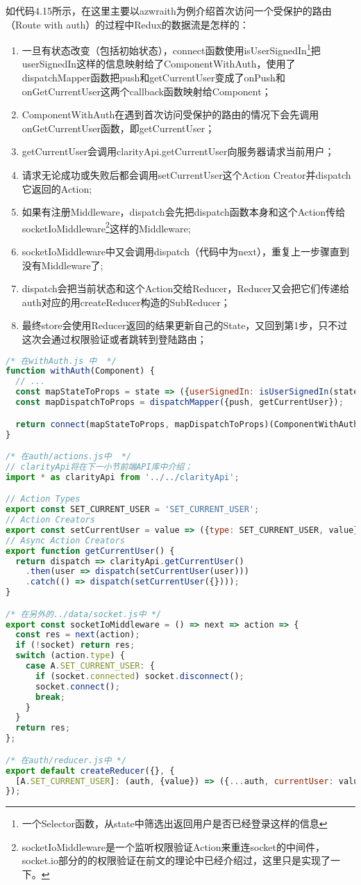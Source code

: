如代码4.15所示，在这里主要以azwraith为例介绍首次访问一个受保护的路由（Route with auth）的过程中Redux的数据流是怎样的：
\begin{enumerate}
  \item 一旦有状态改变（包括初始状态），connect函数使用isUserSignedIn\footnote{一个Selector函数，从state中筛选出返回用户是否已经登录这样的信息}把userSignedIn这样的信息映射给了ComponentWithAuth，使用了dispatchMapper函数把push和getCurrentUser变成了onPush和onGetCurrentUser这两个callback函数映射给Component；
  \item ComponentWithAuth在遇到首次访问受保护的路由的情况下会先调用onGetCurrentUser函数，即getCurrentUser；
  \item getCurrentUser会调用clarityApi.getCurrentUser向服务器请求当前用户；
  \item 请求无论成功或失败后都会调用setCurrentUser这个Action Creator并dispatch它返回的Action;
  \item 如果有注册Middleware，dispatch会先把dispatch函数本身和这个Action传给socketIoMiddleware\footnote{socketIoMiddleware是一个监听权限验证Action来重连socket的中间件，socket.io部分的的权限验证在前文的理论中已经介绍过，这里只是实现了一下。}这样的Middleware;
  \item socketIoMiddleware中又会调用dispatch（代码中为next），重复上一步骤直到没有Middleware了;
  \item dispatch会把当前状态和这个Action交给Reducer，Reducer又会把它们传递给auth对应的用createReducer构造的SubReducer；
  \item 最终store会使用Reducer返回的结果更新自己的State，又回到第1步，只不过这次会通过权限验证或者跳转到登陆路由；
\end{enumerate}
\begin{lstlisting}[language={JavaScript}, caption={Smart City模块权限校验Redux数据流相关代码}]
/* 在withAuth.js 中  */
function withAuth(Component) {
  // ...
  const mapStateToProps = state => ({userSignedIn: isUserSignedIn(state)});
  const mapDispatchToProps = dispatchMapper({push, getCurrentUser});

  return connect(mapStateToProps, mapDispatchToProps)(ComponentWithAuth);
}

/* 在auth/actions.js中  */
// clarityApi将在下一小节前端API库中介绍；
import * as clarityApi from '../../clarityApi';

// Action Types
export const SET_CURRENT_USER = 'SET_CURRENT_USER';
// Action Creators
export const setCurrentUser = value => ({type: SET_CURRENT_USER, value});
// Async Action Creators
export function getCurrentUser() {
  return dispatch => clarityApi.getCurrentUser()
    .then(user => dispatch(setCurrentUser(user)))
    .catch(() => dispatch(setCurrentUser({})));
}

/* 在另外的../data/socket.js中 */
export const socketIoMiddleware = () => next => action => {
  const res = next(action);
  if (!socket) return res;
  switch (action.type) {
    case A.SET_CURRENT_USER: {
      if (socket.connected) socket.disconnect();
      socket.connect();
      break;
    }
  }
  return res;
};

/* 在auth/reducer.js中 */
export default createReducer({}, {
  [A.SET_CURRENT_USER]: (auth, {value}) => ({...auth, currentUser: value}),
});
\end{lstlisting}
